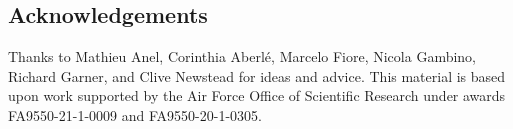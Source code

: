\documentclass[12pt,reqno]{amsart}
\theoremstyle{remark}
\theoremstyle{definition}
\begin{document}
%
%
%


\subsection*{Acknowledgements}

Thanks to Mathieu Anel, Corinthia Aberl\'e, Marcelo Fiore, Nicola Gambino, Richard Garner, and Clive Newstead for ideas and advice.  This material is based upon work supported by the Air Force Office of Scientific Research under awards FA9550-21-1-0009 and FA9550-20-1-0305.




\end{document}
